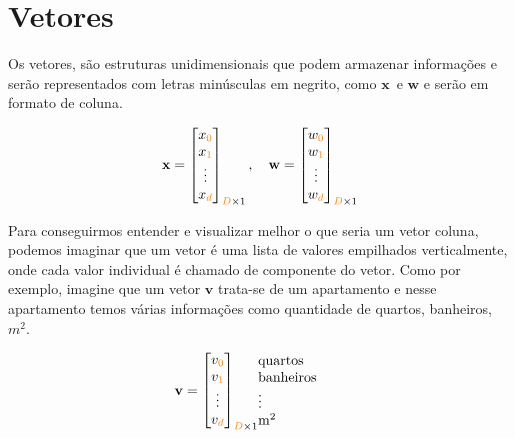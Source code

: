 \section{Vetores} 
\label{sec:vector-section}

Os vetores, são estruturas unidimensionais que podem armazenar informações e serão representados com letras minúsculas em negrito, como $\mathbf{x}$\ e $\mathbf{w}$ e serão 
em formato de coluna. 

\begin{equation}
\begin{aligned}
\mathbf{x} = 
\begin{bmatrix}
    x_{\mathcolor{orange}{0}} \\
    x_{\mathcolor{orange}{1}} \\
    \vdots \\
    x_{\mathcolor{orange}{d}}
\end{bmatrix}_{\mathcolor{orange}{D}\times 1}, \quad
\mathbf{w} = 
\begin{bmatrix}
    w_{\mathcolor{orange}{0}} \\
    w_{\mathcolor{orange}{1}} \\
    \vdots \\
    w_{\mathcolor{orange}{d}}
\end{bmatrix}_{\mathcolor{orange}{D}\times 1} 
\end{aligned}
\end{equation}

Para conseguirmos entender e visualizar melhor o que seria um vetor coluna, podemos imaginar que um vetor é uma lista de valores empilhados verticalmente, onde cada valor individual é chamado de componente do vetor.
Como por exemplo, imagine que um vetor $\mathbf{v}$ trata-se de um apartamento e nesse apartamento temos várias informações
como quantidade de quartos, banheiros, $m^2$.


\begin{equation}
    \mathbf{v} =
    \begin{array}{@{}c@{\qquad}l@{}}
        \vcenter{\hbox{$\begin{bmatrix}
            v_{\mathcolor{orange}{0}} \\
            v_{\mathcolor{orange}{1}} \\
            \vdots \\
            v_{\mathcolor{orange}{d}}
        \end{bmatrix}_{\mathcolor{orange}{D}\times 1}$}}
        \begin{array}{@{}l@{}}
            \text{quartos} \\
            \text{banheiros} \\
            \vdots \\
            \mathrm{m}^2
        \end{array}
    \end{array}
\end{equation}

